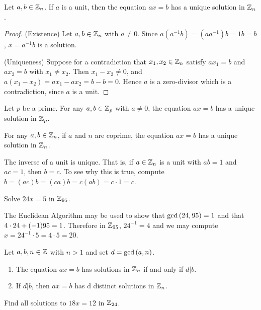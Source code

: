 \documentclass[11pt,fleqn,dvipsnames,usenames]{article}
\begin{document}
\begin{corollary}
Let $a,b\in\mathbb{Z}_{n}$.  If $a$ is a unit, then the equation $ax = b$ has a unique solution in $\mathbb{Z}_{n}$.
\end{corollary}
%
\begin{proof}\phantom{-}

(Existence) Let $a,b\in\mathbb{Z}_{n}$ with $a\neq 0$.  Since $a(a^{-1}b) = (aa^{-1})b = 1b = b$, $x = a^{-1}b$ is a solution.

(Uniqueness) Suppose for a contradiction that $x_{1},x_{2}\in\mathbb{Z}_{n}$ satisfy $ax_{1} = b$ and $ax_{2} = b$ with $x_{1}\neq x_{2}$.  Then $x_{1} - x_{2}\neq 0$, and $a(x_{1} - x_{2}) = ax_{1} - ax_{2} = b - b = 0$.  Hence $a$ is a zero-divisor which is a contradiction, since $a$ is a unit.
\end{proof}
%
\begin{corollary}
Let $p$ be a prime.  For any $a,b\in\mathbb{Z}_p$ with $a\neq 0$, the equation $ax = b$ has a unique solution in $\mathbb{Z}_p$.
\end{corollary}
%
\begin{corollary}
For any $a,b\in\mathbb{Z}_{n}$, if $a$ and $n$ are coprime, the equation $ax = b$ has a unique solution in $\mathbb{Z}_{n}$.
\end{corollary}
%
\begin{remark}
The inverse of a unit is unique.  That is, if $a\in\mathbb{Z}_{n}$ is a unit with $ab = 1$ and $ac = 1$, then $b=c$.  To see why this is true, compute $b = (ac)b = (ca)b = c(ab) = c\cdot 1 = c$.
\end{remark}
%
\begin{example}
Solve $24x = 5$ in $\mathbb{Z}_{95}$.
\end{example}
\begin{solution}
The Euclidean Algorithm may be used to show that $\text{gcd}\left(24,95\right) = 1$ and that $4\cdot 24\nolinebreak + \nolinebreak(-1)95 =\nolinebreak 1$.  Therefore in $\mathbb{Z}_{95}$, $24^{-1} = 4$ and we may compute $x = 24^{-1}\cdot 5 = 4\cdot 5 = 20$.
\end{solution}
%
\begin{theorem}\label{numbersolutionsinZn}
Let $a,b,n\in\mathbb{Z}$ with $n > 1$ and set $d = \text{gcd}\left(a,n\right)$.
\begin{enumerate}[(1)]
\item The equation $ax = b$ has solutions in $\mathbb{Z}_{n}$ if and only if $d|b$.
\item If $d|b$, then $ax = b$ has d distinct solutions in $\mathbb{Z}_{n}$.
\end{enumerate}
\end{theorem}
%
\begin{example}
Find all solutions to $18x = 12$ in $\mathbb{Z}_{24}$.
\end{example}
\end{document}
